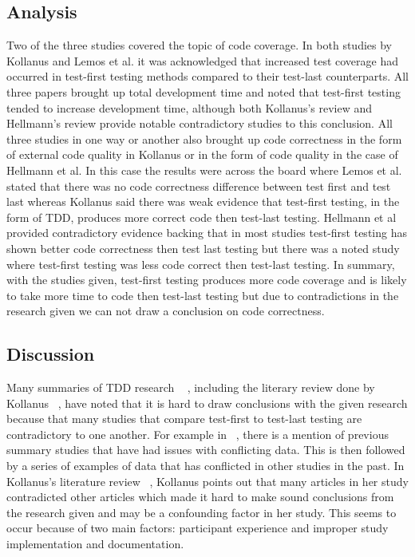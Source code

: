 \documentclass{sig-alternate}
\begin{document}
\subsection{Analysis}
Two of the three studies covered the topic of code coverage.  In both studies by Kollanus and Lemos et al. it was acknowledged that increased test coverage had occurred in test-first testing methods compared to their test-last counterparts.  All three papers brought up total development time and noted that test-first testing tended to increase development time, although both Kollanus's review and Hellmann's review provide notable contradictory studies to this conclusion.   All three studies in one way or another also brought up code correctness in the form of external code quality in Kollanus or in the form of code quality in the case of Hellmann et al.  In this case the results were across the board where Lemos et al. stated that there was no code correctness difference between test first and test last whereas Kollanus said there was weak evidence that test-first testing, in the form of TDD, produces more correct code then test-last testing.  Hellmann et al provided contradictory evidence backing that in most studies test-first testing has shown better code correctness then test last testing but there was a noted study where test-first testing was less code correct then test-last testing.   In summary, with the studies given, test-first testing produces more code coverage and is likely to take more time to code then test-last testing but due to contradictions in the research given we can not draw a conclusion on code correctness.

\subsection{Discussion}
Many summaries of TDD research ~\cite{Hammond:2012, Hellman:2012, Kettunen:2010} , including the literary review done by Kollanus ~\cite{Kollanus:2010}, have noted that it is hard to draw conclusions with the given research because that many studies that compare test-first to test-last testing are contradictory to one another.  For example in ~\cite{Hellman:2012},  there is a mention of previous summary studies that have had issues with conflicting data.  This is then followed by a series of examples of data that has conflicted in other studies in the past.  In Kollanus's literature review ~\cite{Kollanus:2010}, Kollanus points out that many articles in her study contradicted other articles which made it hard to make sound conclusions from the research given and may be a confounding factor in her study.  This seems to occur because of two main factors: participant experience and improper study implementation and documentation.
\end{document}
